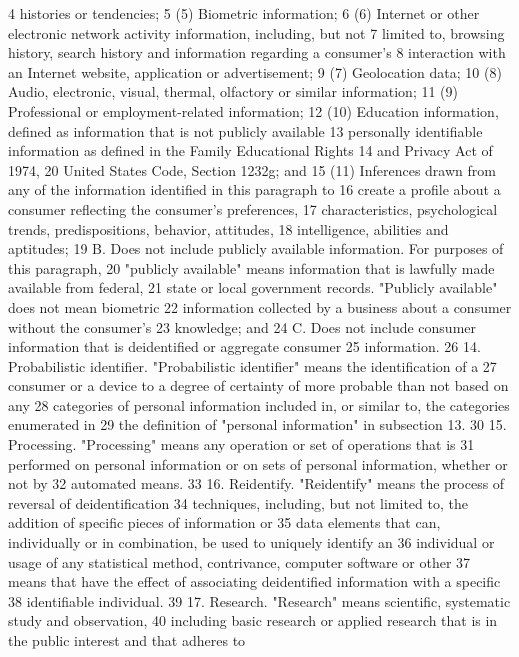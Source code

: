 4 histories or tendencies;
5 (5) Biometric information;
6 (6) Internet or other electronic network activity information, including, but not
7 limited to, browsing history, search history and information regarding a consumer's
8 interaction with an Internet website, application or advertisement;
9 (7) Geolocation data;
10 (8) Audio, electronic, visual, thermal, olfactory or similar information;
11 (9) Professional or employment-related information;
12 (10) Education information, defined as information that is not publicly available
13 personally identifiable information as defined in the Family Educational Rights
14 and Privacy Act of 1974, 20 United States Code, Section 1232g; and
15 (11) Inferences drawn from any of the information identified in this paragraph to
16 create a profile about a consumer reflecting the consumer's preferences,
17 characteristics, psychological trends, predispositions, behavior, attitudes,
18 intelligence, abilities and aptitudes;
19 B. Does not include publicly available information. For purposes of this paragraph,
20 "publicly available" means information that is lawfully made available from federal,
21 state or local government records. "Publicly available" does not mean biometric
22 information collected by a business about a consumer without the consumer's
23 knowledge; and
24 C. Does not include consumer information that is deidentified or aggregate consumer
25 information.
26 14. Probabilistic identifier. "Probabilistic identifier" means the identification of a
27 consumer or a device to a degree of certainty of more probable than not based on any
28 categories of personal information included in, or similar to, the categories enumerated in
29 the definition of "personal information" in subsection 13.
30 15. Processing. "Processing" means any operation or set of operations that is
31 performed on personal information or on sets of personal information, whether or not by
32 automated means.
33 16. Reidentify. "Reidentify" means the process of reversal of deidentification
34 techniques, including, but not limited to, the addition of specific pieces of information or
35 data elements that can, individually or in combination, be used to uniquely identify an
36 individual or usage of any statistical method, contrivance, computer software or other
37 means that have the effect of associating deidentified information with a specific
38 identifiable individual.
39 17. Research. "Research" means scientific, systematic study and observation,
40 including basic research or applied research that is in the public interest and that adheres to
